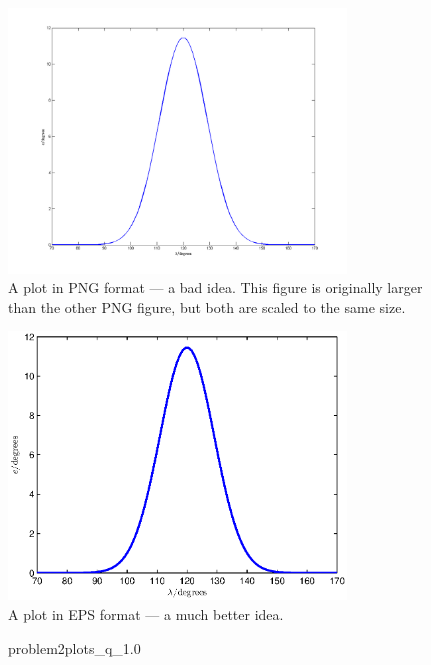 \begin{figure}[htb]
	\centering
		\includegraphics[width=0.8\textwidth]{figures/constraint_png_large.png}
	\caption{A plot in PNG format --- a bad idea. This figure is originally larger than the other PNG figure, but both are scaled to the same size.}
	\label{fig:constraint_png_large}
\end{figure}

\begin{figure}[htb]
	\centering
		\includegraphics[width=0.8\textwidth]{figures/constraint_eps.eps}
	\caption{A plot in EPS format --- a much better idea.}
	\label{fig:constraint_eps}
\end{figure}


\begin{figure}[htbp]
	\centering
	\caption{problem2plots\_q\_1.0}
	\label{fig:problem2plots_q_1.0}%
\end{figure}

